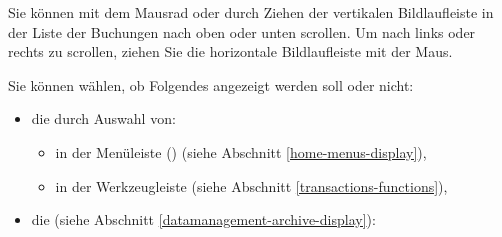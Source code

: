 Sie können mit dem Mausrad oder durch Ziehen der vertikalen Bildlaufleiste in der Liste der Buchungen nach oben oder unten scrollen. Um nach links oder rechts zu scrollen, ziehen Sie die horizontale Bildlaufleiste mit der Maus.

Sie können wählen, ob Folgendes angezeigt werden soll oder nicht:
\begin{itemize}
	\item die  durch Auswahl von:
		\begin{itemize}
			\item in der Menüleiste  () (siehe Abschnitt \vref{home-menus-display}),
			\item in der Werkzeugleiste  (siehe Abschnitt \vref{transactions-functions}),
		\end{itemize} 
	\item die  (siehe Abschnitt  \vref{datamanagement-archive-display}):

\end{itemize}
